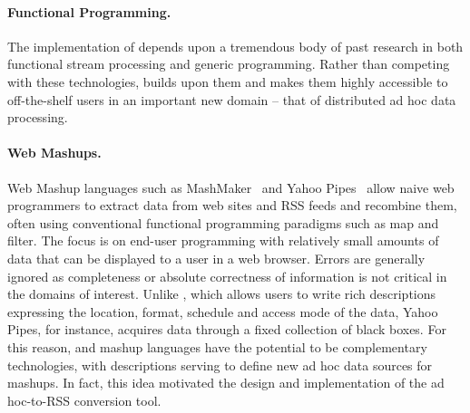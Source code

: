 \paragraph*{Functional Programming.}
The implementation of \padsd{} depends upon a tremendous body of past research
in both functional stream processing and generic programming.  Rather than
competing with these technologies, \padsd{} builds upon them and makes them
highly accessible to off-the-shelf users in an important new
domain -- that of distributed ad hoc data processing.


\paragraph*{Web Mashups.}
Web Mashup languages such as MashMaker~\cite{ennals+:mashmaker} 
and Yahoo Pipes~\cite{yahoopipes} allow naive web programmers to
extract data from web sites and RSS feeds and recombine them,
often using conventional functional programming paradigms such as
map and filter.  The focus is on end-user programming with relatively
small amounts of data that can be displayed to a user in a web
browser. Errors are generally ignored as completeness or absolute 
correctness of information is not critical in the domains of interest.
Unlike \padsd{}, which allows users to write rich descriptions
expressing the location, format, schedule and access mode of the data, 
Yahoo Pipes, for instance, acquires data through a fixed collection of 
black boxes.  For this reason, \padsd{} and mashup languages have the 
potential to be complementary technologies, with \padsd{} descriptions
serving to define new ad hoc data sources for mashups.  In fact, this
idea motivated the design and implementation of the \padsd{} ad
hoc-to-RSS conversion tool. 

